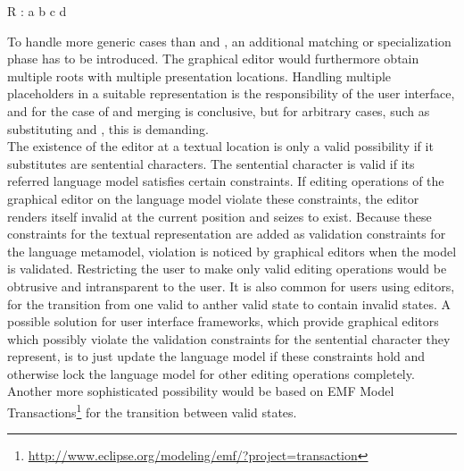 \begin{xtxt}
R : a b c d
\end{xtxt}
To handle more generic cases than  and , an additional matching or specialization phase has to be introduced. The graphical editor would furthermore obtain multiple roots with multiple presentation locations. Handling multiple placeholders in a suitable representation is the responsibility of the user interface, and for the case of  and  merging is conclusive, but for arbitrary cases, such as substituting  and , this is demanding.\\
The existence of the editor at a textual location is only a valid possibility if it substitutes are sentential characters. The sentential character is valid if its referred language model satisfies certain constraints. If editing operations of the graphical editor on the language model violate these constraints, the editor renders itself invalid at the current position and seizes to exist. Because these constraints for the textual representation are added as validation constraints for the language metamodel, violation is noticed by graphical editors when the model is validated. Restricting the user to make only valid editing operations would be obtrusive and intransparent to the user. It is also common for users using editors, for the transition from one valid to anther valid state to contain invalid states. A possible solution for user interface frameworks, which provide graphical editors which possibly violate the validation constraints for the sentential character they represent, is to just update the language model if these constraints hold and otherwise lock the language model for other editing operations completely. Another more sophisticated possibility would be based on EMF Model Transactions\footnote{\raggedright \url{http://www.eclipse.org/modeling/emf/?project=transaction}} for the transition between valid states.\\
